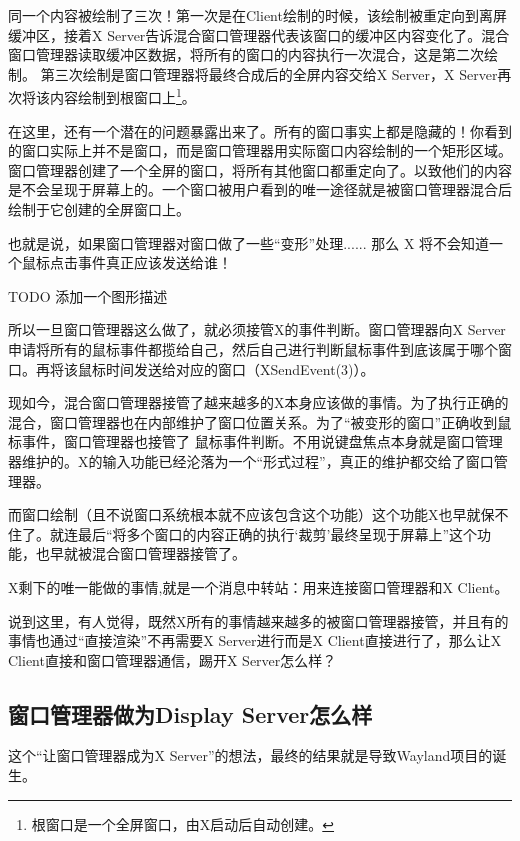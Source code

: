 \documentclass[amstex,twoside]{ctexbook}
\begin{document}
同一个内容被绘制了三次！第一次是在Client绘制的时候，该绘制被重定向到离屏缓冲区，接着X Server告诉混合窗口管理器代表该窗口的缓冲区内容变化了。混合窗口管理器读取缓冲区数据，将所有的窗口的内容执行一次混合，这是第二次绘制。
第三次绘制是窗口管理器将最终合成后的全屏内容交给X Server，X Server再次将该内容绘制到根窗口上\footnote{根窗口是一个全屏窗口，由X启动后自动创建。}。

在这里，还有一个潜在的问题暴露出来了。所有的窗口事实上都是隐藏的！你看到的窗口实际上并不是窗口，而是窗口管理器用实际窗口内容绘制的一个矩形区域。
窗口管理器创建了一个全屏的窗口，将所有其他窗口都重定向了。以致他们的内容是不会呈现于屏幕上的。一个窗口被用户看到的唯一途径就是被窗口管理器混合后绘制于它创建的全屏窗口上。

也就是说，如果窗口管理器对窗口做了一些“变形”处理...... 那么 X 将不会知道一个鼠标点击事件真正应该发送给谁！

TODO 添加一个图形描述

所以一旦窗口管理器这么做了，就必须接管X的事件判断。窗口管理器向X Server申请将所有的鼠标事件都揽给自己，然后自己进行判断鼠标事件到底该属于哪个窗口。再将该鼠标时间发送给对应的窗口（XSendEvent(3)）。

现如今，混合窗口管理器接管了越来越多的X本身应该做的事情。为了执行正确的混合，窗口管理器也在内部维护了窗口位置关系。为了“被变形的窗口”正确收到鼠标事件，窗口管理器也接管了
鼠标事件判断。不用说键盘焦点本身就是窗口管理器维护的。X的输入功能已经沦落为一个“形式过程”，真正的维护都交给了窗口管理器。

而窗口绘制（且不说窗口系统根本就不应该包含这个功能）这个功能X也早就保不住了。就连最后“将多个窗口的内容正确的执行‘裁剪’最终呈现于屏幕上”这个功能，也早就被混合窗口管理器接管了。

X剩下的唯一能做的事情,就是一个消息中转站：用来连接窗口管理器和X Client。

说到这里，有人觉得，既然X所有的事情越来越多的被窗口管理器接管，并且有的事情也通过“直接渲染”不再需要X Server进行而是X Client直接进行了，那么让X Client直接和窗口管理器通信，踢开X Server怎么样？

\subsection{窗口管理器做为Display Server怎么样}

这个“让窗口管理器成为X Server”的想法，最终的结果就是导致Wayland项目的诞生。

\end{document}

